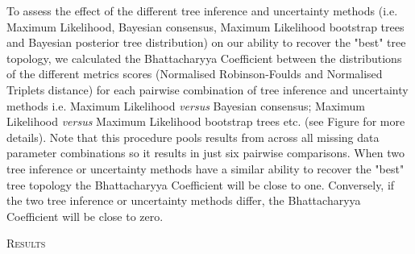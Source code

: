 \documentclass[12pt,letterpaper]{article}
\renewcommand{\section}[1]{%
\bigskip
\begin{center}
\begin{Large}
\normalfont\scshape #1
\medskip
\end{Large}
\end{center}}
\begin{document}
To assess the effect of the different tree inference and uncertainty methods (i.e. Maximum Likelihood, Bayesian consensus, Maximum Likelihood bootstrap trees and Bayesian posterior tree distribution) on our ability to recover the "best" tree topology, we calculated the Bhattacharyya Coefficient between the distributions of the different metrics scores (Normalised Robinson-Foulds and Normalised Triplets distance) for each pairwise combination of tree inference and uncertainty methods i.e. Maximum Likelihood \textit{versus} Bayesian consensus; Maximum Likelihood \textit{versus} Maximum Likelihood bootstrap trees etc. (see Figure %
for more details). Note that this procedure pools results from across all missing data parameter combinations so it results in just six pairwise comparisons. When two tree inference or uncertainty methods have a similar ability to recover the "best" tree topology the Bhattacharyya Coefficient will be close to one. Conversely, if the two tree inference or uncertainty methods differ, the Bhattacharyya Coefficient will be close to zero.

%
%

\section{Results}

\end{document}
